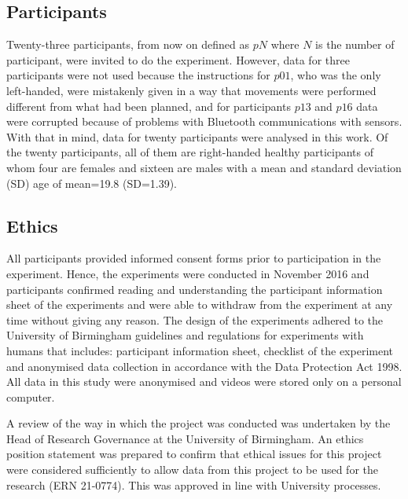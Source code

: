 \documentclass[fleqn,10pt]{wlscirep}
\begin{document}
\subsection*{Participants}
Twenty-three participants, from now on defined as $pN$ where $N$ is the number of participant, were invited to do the experiment. However, data for three participants were not used because the instructions for $p01$, who was the only left-handed, were mistakenly given in a way that movements were performed different from what had been planned, and for participants $p13$ and $p16$ data were corrupted because of problems with Bluetooth communications with sensors.
With that in mind, data for twenty participants were analysed in this work.
Of the twenty participants, all of them are right-handed healthy participants of whom four are females and sixteen are males with a mean and standard deviation (SD) age of mean=19.8 (SD=1.39).

\subsection*{Ethics}
All participants provided informed consent forms prior to participation in the experiment. 
Hence, the experiments were conducted in November 2016 and participants confirmed reading and understanding the participant information sheet of the experiments and were able to withdraw from the experiment at any time without giving any reason.
The design of the experiments adhered to the University of Birmingham guidelines and regulations for experiments with humans that includes: participant information sheet, checklist of the experiment and anonymised data collection in accordance with the Data Protection Act 1998.
All data in this study were anonymised and videos were stored only on a personal computer.

A review of the way in which the project was conducted was undertaken by the Head of Research Governance at the University of Birmingham. 
An ethics position statement was prepared to confirm that ethical issues for this project were considered sufficiently to allow data from this project to be used for the research (ERN 21-0774).
This was approved in line with University processes.
\end{document}
